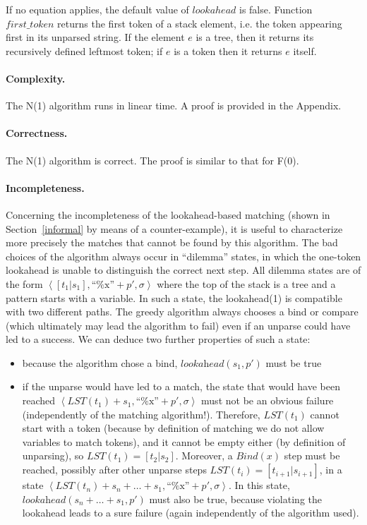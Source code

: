 \documentclass{sigplanconf}
\begin{document}
If no equation applies, the default value of $lookahead$ is false.
Function $first\_token$ returns the first token of a stack element,
i.e. the token appearing first in its unparsed string.  If the element
$e$ is a tree, then it returns its recursively defined leftmost token;
if $e$ is a token then it returns $e$ itself.

\paragraph{Complexity.} The N(1) algorithm runs in linear time. A proof
is provided in the Appendix.

\paragraph{Correctness.} The N(1) algorithm is correct. The proof is
similar to that for F(0).

\paragraph{Incompleteness.}
\label{incomplet}
Concerning the incompleteness of the lookahead-based matching (shown
in Section~\ref{informal} by means of a counter-example), it is useful
to characterize more precisely the matches that cannot be found by
this algorithm. The bad choices of the algorithm always occur in
``dilemma'' states, in which the one-token lookahead is unable to
distinguish the correct next step. All dilemma states are of the form
$\left<[t_1 | s_1], \mbox{``\%x''}+p', \sigma\right>$ where the top of
the stack is a tree and a pattern starts with a variable. In such a
state, the lookahead(1) is compatible with two different paths. The
greedy algorithm always chooses a bind or compare (which ultimately
may lead the algorithm to fail) even if an unparse could have led to
a success. We can deduce two further properties of such a state:
\begin{itemize}
\item because the algorithm chose a bind, $\textit{lookahead}(s_1,p')$
must be true

\item if the unparse would have led to a match, the state that would
have been reached $\left<LST(t_1)+s_1, \mbox{``\%x''}+p',
\sigma\right>$ must not be an obvious failure (independently of the
matching algorithm!). Therefore, $LST(t_1)$ cannot start with a token
(because by definition of matching we do not allow variables to match
tokens), and it cannot be empty either (by definition of unparsing),
so $LST(t_1) = [t_2 | s_2]$. Moreover, a $Bind(x)$ step must be
reached, possibly after other unparse steps $LST(t_i) = [t_{i+1} |
s_{i+1}]$, in a state $\left<LST(t_n)+s_n+\dots+s_1,
\mbox{``\%x''}+p', \sigma\right>$. In this state,
$\textit{lookahead}(s_n+\dots+s_1, p')$ must also be true, because
violating the lookahead leads to a sure failure (again independently
of the algorithm used).
\end{itemize}
\end{document}

